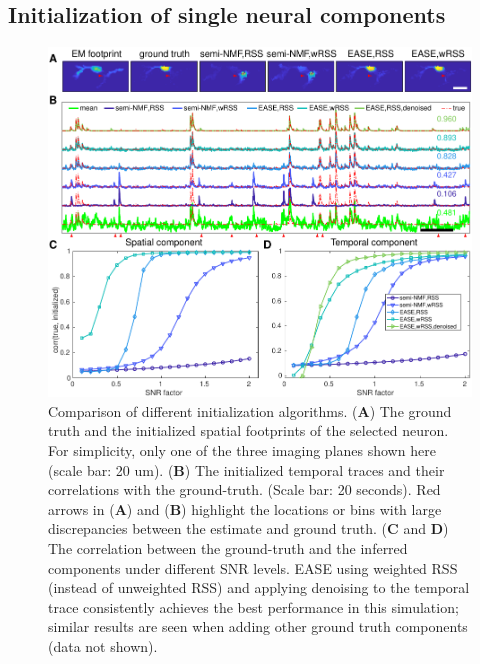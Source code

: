 \documentclass[10pt,letterpaper]{article}
\begin{document}
{\subsection{Initialization of single neural components}
\begin{figure}[t!]
	\centering
	\includegraphics[width=1\textwidth]{Figs/fig_initialization.pdf}
	\caption{Comparison of different initialization algorithms.  (\textbf{A}) The ground truth and the initialized spatial footprints of the selected neuron. For simplicity, only one of the three imaging planes shown here (scale bar: 20 um). (\textbf{B}) The initialized temporal traces and their correlations with the ground-truth. %
	(Scale bar: 20 seconds).  Red arrows in (\textbf{A}) and (\textbf{B}) highlight the locations or bins with large discrepancies between the estimate and ground truth. (\textbf{C} and \textbf{D}) The correlation between the ground-truth and the inferred components under different SNR levels. EASE using weighted RSS (instead of unweighted RSS) and applying denoising to the temporal trace consistently achieves the best performance in this simulation; similar results are seen when adding other ground truth components (data not shown).}
\label{fig:init_ac}
\end{figure}
}
\end{document}
